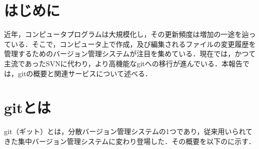 \documentclass[a4paper,10pt,twocolumn]{jsarticle}
\begin{document}


\section{はじめに}
近年，コンピュータプログラムは大規模化し，その更新頻度は増加の一途を辿っている．そこで，コンピュータ上で作成，及び編集されるファイルの変更履歴を管理するためのバージョン管理システムが注目を集めている．現在では，かつて主流であったSVNに代わり，より高機能なgitへの移行が進んでいる．本報告では，gitの概要と関連サービスについて述べる．

\section{gitとは}
git（ギット）とは，分散バージョン管理システムの1つであり，従来用いられてきた集中バージョン管理システムに変わり登場した．その概要を以下のに示す．
\end{document}
